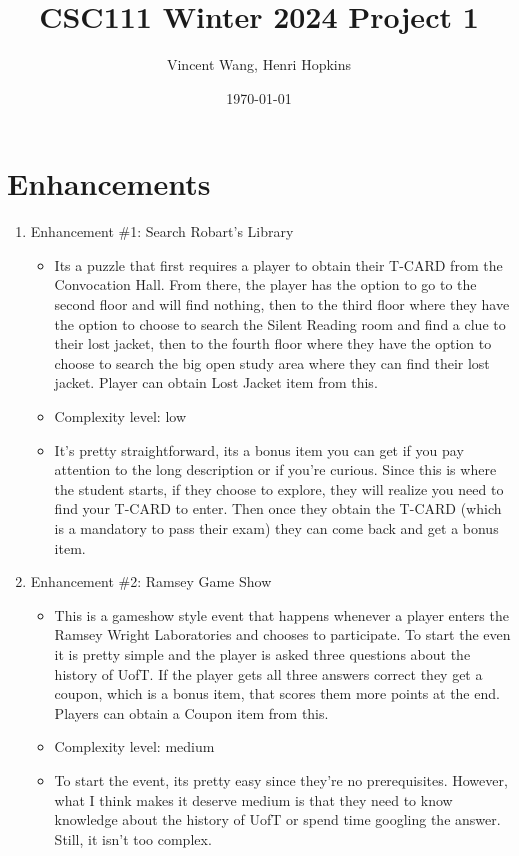 \documentclass[11pt]{article}
\title{CSC111 Winter 2024 Project 1}
\author{Vincent Wang, Henri Hopkins}
\date{\today}
\begin{document}
\maketitle

\section*{Enhancements}


\begin{enumerate}

\item Enhancement \#1: Search Robart's Library
	\begin{itemize}
	\item Its a puzzle that first requires a player to obtain their T-CARD from the Convocation Hall. From there, the player has the option to go to the second floor and will find nothing, then to the third floor where they have the option to choose to search the Silent Reading room and find a clue to their lost jacket, then to the fourth floor where they have the option to choose to search the big open study area where they can find their lost jacket. Player can obtain Lost Jacket item from this.
	\item Complexity level: low
	\item It's pretty straightforward, its a bonus item you can get if you pay attention to the long description or if you're curious. Since this is where the student starts, if they choose to explore, they will realize you need to find your T-CARD to enter. Then once they obtain the T-CARD (which is a mandatory to pass their exam) they can come back and get a bonus item.
	\end{itemize}

\item Enhancement \#2: Ramsey Game Show
	\begin{itemize}
	\item This is a gameshow style event that  happens whenever a player enters the Ramsey Wright Laboratories and chooses to participate. To start the even it is pretty simple and the player is asked three questions about the history of UofT. If the player gets all three answers correct they get a coupon, which is a bonus item, that scores them more points at the end. Players can obtain a Coupon item from this.
	\item Complexity level: medium
	\item To start the event, its pretty easy since they're no prerequisites. However, what I think makes it deserve medium is that they need to know knowledge about the history of UofT or spend time googling the answer. Still, it isn't too complex.
	\end{itemize}


\end{enumerate}
\end{document}

